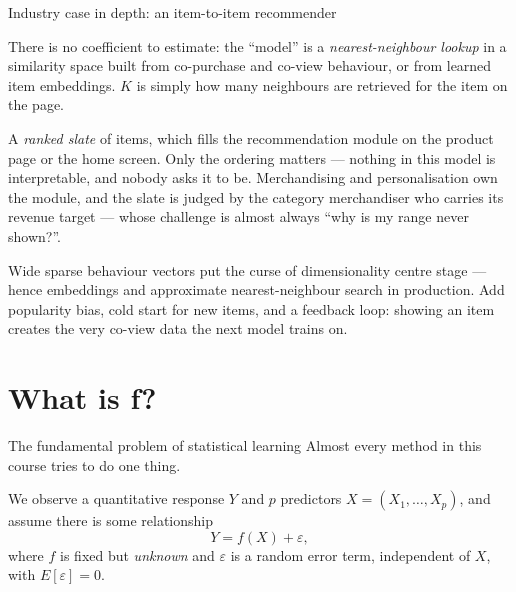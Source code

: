 \documentclass[aspectratio=169,11pt]{beamer}
\begin{document}
\begin{frame}{Industry case in depth: an item-to-item recommender}
  \footnotesize
  \begin{industry}
    There is no coefficient to estimate: the ``model'' is a \emph{nearest-neighbour lookup} in
    a similarity space built from co-purchase and co-view behaviour, or from learned item
    embeddings. $K$ is simply how many neighbours are retrieved for the item on the page.
  \end{industry}
  \begin{readme}
    A \emph{ranked slate} of items, which fills the recommendation module on the product page
    or the home screen. Only the ordering matters --- nothing in this model is interpretable,
    and nobody asks it to be. Merchandising and personalisation own the module, and the
    slate is judged by the category merchandiser who carries its revenue target --- whose
    challenge is almost always ``why is my range never shown?''.
  \end{readme}
  \begin{takeaway}
    Wide sparse behaviour vectors put the curse of dimensionality centre stage --- hence
    embeddings and approximate nearest-neighbour search in production. Add popularity bias,
    cold start for new items, and a feedback loop: showing an item creates the very co-view
    data the next model trains on.
  \end{takeaway}
\end{frame}

\section{What is f?}

\begin{frame}{The fundamental problem of statistical learning}
  Almost every method in this course tries to do one thing.
  \begin{takeaway}
    We observe a quantitative response $Y$ and $p$ predictors
    $X = (X_1, \ldots, X_p)$, and assume there is some relationship
    \[
      \boxed{\;Y = f(X) + \varepsilon,\;}
    \]
    where $f$ is fixed but \emph{unknown} and $\varepsilon$ is a
    random error term, independent of $X$, with $E[\varepsilon] = 0$.
  \end{takeaway}
\end{frame}
\end{document}
